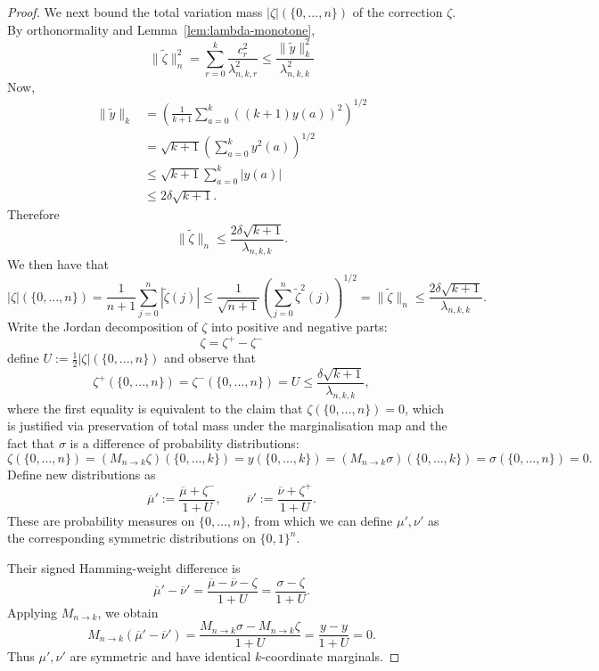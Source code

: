 \documentclass[manuscript,nonacm]{acmart}
\begin{document}
\begin{proof}
We next bound the total variation mass $|\zeta|(\{0,...,n\})$ of the correction \(\zeta\). By
orthonormality and Lemma~\ref{lem:lambda-monotone},
\[
    \|\widetilde{\zeta}\|_n^2
    =
    \sum_{r=0}^k
    \frac{c_r^2}{\lambda_{n,k,r}^2}\leq \frac{\|\widetilde{y}\|^2_k}{\lambda^2_{n,k,k}}
\]
Now,
\[
\begin{aligned}
    \|\widetilde{y}\|_k
    &=
    \left(
        \frac1{k+1}
        \sum_{a=0}^k ((k+1)y(a))^2
    \right)^{1/2}                                               \\
    &=
    \sqrt{k+1}
    \left(
        \sum_{a=0}^k y^2(a)
    \right)^{1/2}                                               \\
    &\le
    \sqrt{k+1}\sum_{a=0}^k|y(a)|                                          \\
    &\le
    2\delta\sqrt{k+1}.
\end{aligned}
\]
Therefore
\[
    \|\widetilde{\zeta}\|_n
    \le
    \frac{2\delta\sqrt{k+1}}{\lambda_{n,k,k}}.
\]
We then have that
\[
    |\zeta|(\{0,...,n\})= \frac{1}{n+1}\sum_{j=0}^n|\widetilde{\zeta}(j)|\leq\frac{1}{\sqrt{n+1}}\left(\sum_{j=0}^n\widetilde{\zeta}^2(j)\right)^{1/2}=\|\widetilde{\zeta}\|_n\leq\frac{2\delta\sqrt{k+1}}{\lambda_{n,k,k}}.
\]
Write the Jordan decomposition of $\zeta$ into positive and negative parts:
\[
    \zeta=\zeta^+-\zeta^-
\]
define $U:=\frac12|\zeta|(\{0,...,n\})$ and observe that 
\begin{equation}
\label{eq:aBound}
    \zeta^+(\{0,...,n\})=\zeta^-(\{0,...,n\})=U\leq \frac{\delta\sqrt{k+1}}{\lambda_{n,k,k}},
\end{equation}
where the first equality is equivalent to the claim that $\zeta(\{0,...,n\})=0$, which is justified via preservation of total mass under the marginalisation map and the fact that $\sigma$ is a difference of probability distributions:
\[
    \zeta(\{0,\dots,n\})
    =
    (M_{n\to k}\zeta)(\{0,\dots,k\})
    =
    y(\{0,\dots,k\})
    =
    (M_{n\to k}\sigma)(\{0,\dots,k\})
    =
    \sigma(\{0,\dots,n\})
    =
    0.
\]
Define new distributions as
\[
    \overline{\mu}' :=
    \frac{\overline{\mu}+\zeta^-}{1+U},
    \qquad
    \overline{\nu}' :=
    \frac{\overline{\nu}+\zeta^+}{1+U}.
\]
These are probability measures on \(\{0,\dots,n\}\), from which we can define \(\mu',\nu'\) as the corresponding symmetric distributions on \(\{0,1\}^n\).

Their signed Hamming-weight difference is
\[
    \overline{\mu}'-\overline{\nu}'
    =
    \frac{\overline{\mu}-\overline{\nu}-\zeta}{1+U}
    =
    \frac{\sigma-\zeta}{1+U}.
\]
Applying \(M_{n\to k}\), we obtain
\[
    M_{n\to k}(\overline{\mu}'-\overline{\nu}')
    =
    \frac{M_{n\to k}\sigma-M_{n\to k}\zeta}{1+U}
    =
    \frac{y-y}{1+U}
    =
    0.
\]
Thus \(\mu',\nu'\) are symmetric and have identical \(k\)-coordinate marginals. 


\end{proof}
\end{document}
